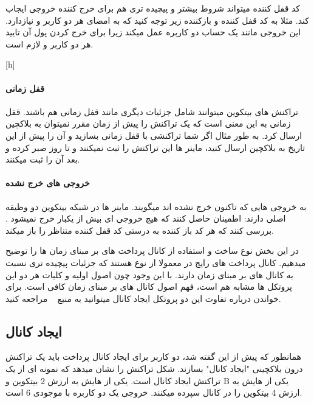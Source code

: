 کد قفل کننده میتواند شروط بیشتر و پیچیده تری هم برای خرج کننده خروجی ایجاب کند. مثلا به کد قفل کننده و بازکننده زیر توجه کنید که به امضای هر دو کاربر   و   نیازدارد. این خروجی مانند یک حساب دو کاربره عمل میکند زیرا برای خرج کردن پول آن تایید هر دو کاربر   و   لازم است.

[h]

\paragraph{قفل زمانی}
تراکنش های بیتکوین میتوانند شامل جزئیات دیگری مانند قفل زمانی هم باشند. قفل زمانی به این معنی است که یک تراکنش را پیش از زمان مقرر نمیتوان به بلاکچین ارسال کرد. به طور مثال اگر شما تراکنشی با قفل زمانی  بسازید و آن را پیش از این تاریخ به بلاکچین ارسال کنید، ماینر ها این تراکنش را ثبت نمیکنند و تا روز  صبر کرده و بعد آن را ثبت میکنند.

\paragraph{خروجی های خرج نشده}
به خروجی هایی که تاکنون خرج نشده اند  میگویند.  ماینر ها در شبکه بیتکوین دو وظیفه اصلی دارند:
 اطمینان حاصل کنند که هیچ خروجی ای بیش از یکبار خرج نمیشود .
 بررسی کنند که هر کد باز کننده به درستی کد قفل کننده متناظر را باز میکند.


در این بخش نوع ساخت و استفاده از کانال پرداخت های بر مبنای زمان ها را توضیح میدهیم. کانال پرداخت های رایج در  معمولا از نوع  هستند که  جزئیات پیچیده تری نسبت به کانال های بر مبنای زمان دارند. با این وجود چون اصول اولیه و کلیات هر دو این پروتکل ها مشابه هم است، فهم اصول کانال های بر مبنای زمان کافی است. برای خواندن درباره تفاوت این دو پروتکل ایجاد کانال میتوانید به منبع
~\cite{paymentChannBlog} 
مراجعه کنید.


\subsection{ایجاد کانال}
همانطور که پیش از این گفته شد، دو کاربر برای ایجاد کانال پرداخت باید یک تراکنش درون بلاکچینی "ایجاد کانال" بسازند. شکل  تراکنش  را نشان میدهد که نمونه ای از یک تراکنش ایجاد کانال است.  یکی از  هایش به ارزش $2$ بیتکوین و B یکی از  هایش به ارزش $4$ بیتکوین را در کانال سپرده میکنند. خروجی  یک  دو کاربره با موجودی 6 است. 

